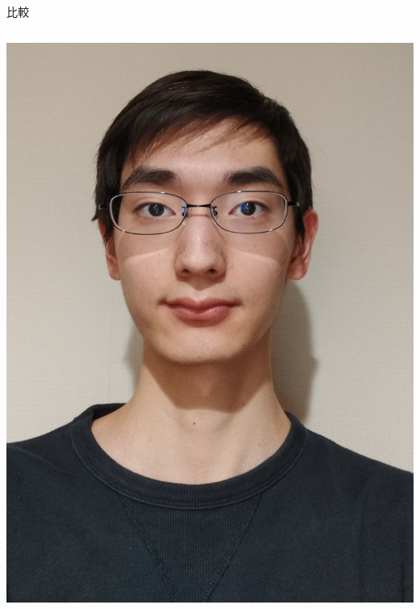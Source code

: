 \documentclass[unicode,12pt,aspectratio=169, dvipdfmx]{beamer}
\begin{document}
\begin{frame}{比較}
\begin{columns}
\begin{column}{.5\linewidth}
\begin{center}
                    \includegraphics[scale=0.045]{figures/after.jpeg}
                \end{center}
            \end{column}
        \end{columns}
    \end{frame}
\end{document}
